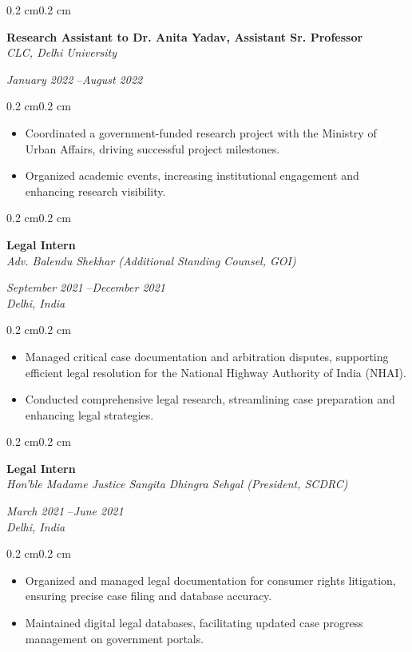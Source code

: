 \documentclass[10pt, letterpaper]{article}
\newenvironment{highlights}{%
    \begin{itemize}[
        topsep=0.10 cm,%
        parsep=0.10 cm,%
        partopsep=0pt,%
        itemsep=0pt,%
        leftmargin=0.4 cm + 10pt%
    ]
}{%
    \end{itemize}%
}
\newenvironment{onecolentry}{%
    \begin{adjustwidth}{0.2 cm}{0.2 cm}%
}{%
    \end{adjustwidth}%
}
\newenvironment{twocolentry}[1]{%
    \begin{onecolentry}%
    \def\twocolentryarg{#1}%
    \noindent
    \begin{minipage}[t]{0.68\textwidth} %
}{%
    \end{minipage}\hfill%
    \begin{minipage}[t]{0.30\textwidth} %
      \raggedleft\twocolentryarg
    \end{minipage}%
    \vspace{0.2cm}%
    \end{onecolentry}%
}
\begin{document}
\vspace{0.2 cm}
\begin{twocolentry}{%
\textit{January 2022 }--\textit{August 2022} \\[0.1cm]
\textit{}%
}
    \textbf{Research Assistant to Dr. Anita Yadav, Assistant Sr. Professor }\\
    \textit{CLC, Delhi University }
\end{twocolentry}
\vspace{0.10 cm}
\begin{onecolentry}
    \begin{highlights}
        \item Coordinated a government-funded research project with the Ministry of Urban Affairs, driving successful project milestones.
        \item Organized academic events, increasing institutional engagement and enhancing research visibility.
    \end{highlights}
\end{onecolentry}
\vspace{0.2 cm}
\begin{twocolentry}{%
\textit{September 2021 }--\textit{December 2021} \\[0.1cm]
\textit{Delhi, India}%
}
    \textbf{Legal Intern }\\
    \textit{Adv. Balendu Shekhar (Additional Standing Counsel, GOI) }
\end{twocolentry}
\vspace{0.10 cm}
\begin{onecolentry}
    \begin{highlights}
        \item Managed critical case documentation and arbitration disputes, supporting efficient legal resolution for the National Highway Authority of India (NHAI).
        \item Conducted comprehensive legal research, streamlining case preparation and enhancing legal strategies.
    \end{highlights}
\end{onecolentry}
\vspace{0.2 cm}
\begin{twocolentry}{%
\textit{March 2021 }--\textit{June 2021} \\[0.1cm]
\textit{Delhi, India}%
}
    \textbf{Legal Intern }\\
    \textit{Hon’ble Madame Justice Sangita Dhingra Sehgal (President, SCDRC) }
\end{twocolentry}
\vspace{0.10 cm}
\begin{onecolentry}
    \begin{highlights}
        \item Organized and managed legal documentation for consumer rights litigation, ensuring precise case filing and database accuracy.
        \item Maintained digital legal databases, facilitating updated case progress management on government portals.
    \end{highlights}
\end{onecolentry}
\vspace{0.2 cm}
\end{document}
